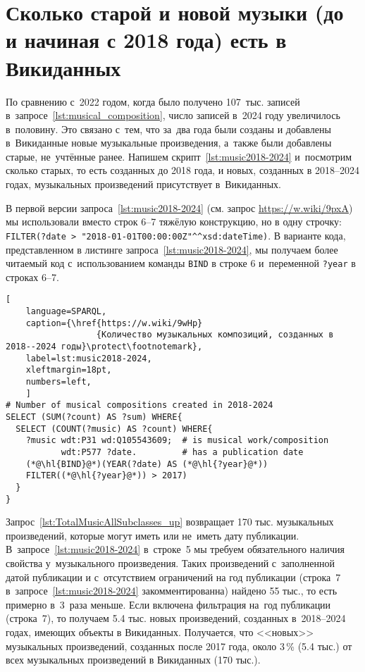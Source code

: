 \section{Сколько старой и новой музыки (до и начиная с 2018 года) есть в Викиданных}

По сравнению с~2022 годом, когда было получено 107~тыс. записей в~запросе~\ref{lst:musical_composition}, 
число записей в~2024 году увеличилось в~половину. 
Это связано с~тем, что за~два года были созданы и добавлены в~Викиданные новые музыкальные произведения, 
а~также были добавлены старые, не~учтённые ранее. 
Напишем скрипт~\ref{lst:music2018-2024} и~посмотрим сколько 
старых, то есть созданных до 2018 года, и новых, созданных в 2018--2024 годах, 
музыкальных произведений присутствует в~Викиданных.

В первой версии запроса~\ref{lst:music2018-2024} 
(см. запрос \href{https://w.wiki/9pxA}{https://w.wiki/9pxA}) 
мы использовали вместо строк 6--7 тяжёлую конструкцию, но в одну строчку: 
\lstinline|FILTER(?date > "2018-01-01T00:00:00Z"^^xsd:dateTime)|. 
%
В варианте кода, представленном в листинге запроса~\ref{lst:music2018-2024}, 
мы получаем более читаемый код с~использованием команды \lstinline|BIND| в строке 6 
и~переменной \lstinline|?year| в строках 6--7.


\newpage
\begin{lstlisting}[ 
    language=SPARQL,
    caption={\href{https://w.wiki/9wHp}
                  {Количество музыкальных композиций, созданных в 2018--2024 годы}\protect\footnotemark},
    label=lst:music2018-2024,
    xleftmargin=18pt,
    numbers=left,
    ]
# Number of musical compositions created in 2018-2024
SELECT (SUM(?count) AS ?sum) WHERE{
  SELECT (COUNT(?music) AS ?count) WHERE{
    ?music wdt:P31 wd:Q105543609;  # is musical work/composition
           wdt:P577 ?date.         # has a publication date
    (*@\hl{BIND}@*)(YEAR(?date) AS (*@\hl{?year}@*))
    FILTER((*@\hl{?year}@*)) > 2017)
  }
}
\end{lstlisting}%


Запрос~\ref{lst:TotalMusicAllSubclasses_up} 
возвращает 170 тыс. музыкальных произведений, которые могут иметь или не~иметь дату публикации. 
В~запросе~\ref{lst:music2018-2024} в~строке~5 
мы требуем обязательного наличия свойства  у~музыкального произведения.
Таких произведений с~заполненной датой публикации и 
с~отсутствием ограничений на год публикации 
(строка~7 в~запросе~\ref{lst:music2018-2024} закомментированна) 
найдено 55 тыс., 
то есть примерно в~3~раза меньше. 
Если включена фильтрация на~год публикации (строка~7), 
то получаем 5.4 тыс. новых произведений, созданных в~2018--2024 годах, имеющих объекты в Викиданных. 
Получается, что <<новых>> музыкальных произведений, созданных после 2017 года,  
около 3\,\% (5.4 тыс.) от всех музыкальных произведений в Викиданных (170 тыс.).






